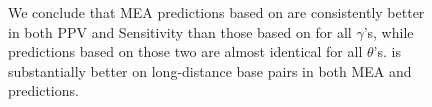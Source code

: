 \begin{figure}[hbt!]
{	%
        We conclude that MEA predictions based on \linearpartitionv are consistently better in both PPV and Sensitivity than
        those based on \viennarnafold for all $\gamma$'s,
        while \threshknot predictions based on those two are almost identical for all $\theta$'s.
        \linearpartitionv is  substantially better on long-distance base pairs in both MEA and \threshknot predictions.
	\label{mea}
        \vspace{-0.6cm}
}
\end{figure}
